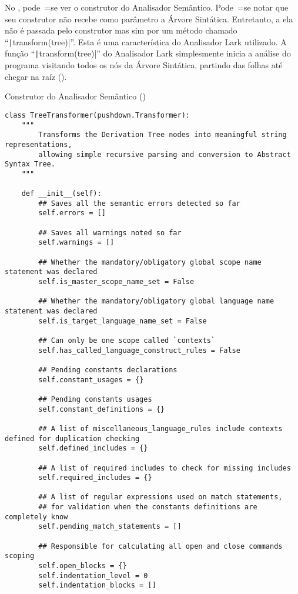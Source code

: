 No ,
pode~=se ver o construtor do Analisador Semântico.
Pode~=se notar que seu construtor não recebe como parâmetro a Árvore Sintática.
Entretanto,
a ela não é passada pelo construtor mas sim por um método chamado ``\texttt|transform(tree)|''.
Esta é uma característica do Analisador Lark utilizado.
A função ``\texttt|transform(tree)|'' do Analisador Lark simplesmente inicia a análise do programa visitando todos os nós da Árvore Sintática,
partindo das folhas até chegar na raíz ().
\begin{code}
\caption[Construtor do Analisador Semântico]{Construtor do Analisador Semântico ()}
\label{code:semanticAnalizerConstructor}
\begin{verbatim}
class TreeTransformer(pushdown.Transformer):
    """
        Transforms the Derivation Tree nodes into meaningful string representations,
        allowing simple recursive parsing and conversion to Abstract Syntax Tree.
    """

    def __init__(self):
        ## Saves all the semantic errors detected so far
        self.errors = []

        ## Saves all warnings noted so far
        self.warnings = []

        ## Whether the mandatory/obligatory global scope name statement was declared
        self.is_master_scope_name_set = False

        ## Whether the mandatory/obligatory global language name statement was declared
        self.is_target_language_name_set = False

        ## Can only be one scope called `contexts`
        self.has_called_language_construct_rules = False

        ## Pending constants declarations
        self.constant_usages = {}

        ## Pending constants usages
        self.constant_definitions = {}

        ## A list of miscellaneous_language_rules include contexts defined for duplication checking
        self.defined_includes = {}

        ## A list of required includes to check for missing includes
        self.required_includes = {}

        ## A list of regular expressions used on match statements,
        ## for validation when the constants definitions are completely know
        self.pending_match_statements = []

        ## Responsible for calculating all open and close commands scoping
        self.open_blocks = {}
        self.indentation_level = 0
        self.indentation_blocks = []
\end{verbatim}
\end{code}


